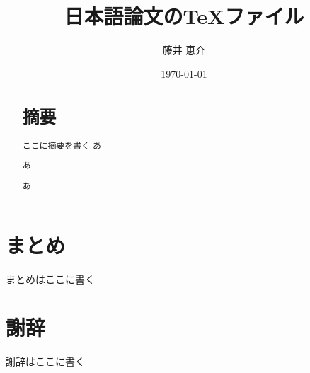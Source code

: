 \documentclass[a4paper,10pt,onecolumn,oneside,openany]{jsbook}%
\begin{document}
\title{日本語論文のTeXファイル}

\author{藤井 恵介}

\date{\today}

\maketitle

\begin{abstract}
  \section*{摘要}
ここに摘要を書く
あ

あ

あ
\end{abstract}

\tableofcontents %




\chapter{まとめ}
まとめはここに書く

\chapter*{謝辞}
謝辞はここに書く



\end{document}
